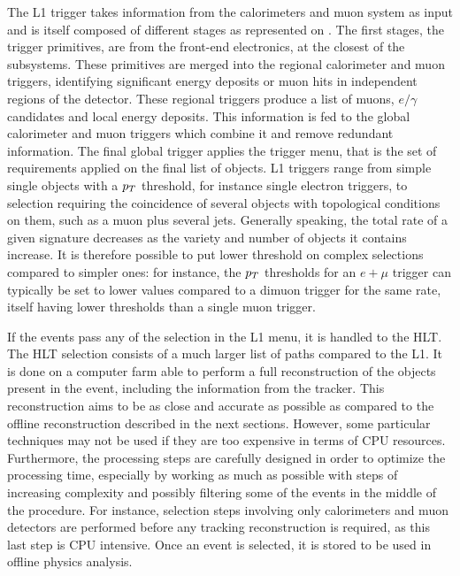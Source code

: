     The L1 trigger takes information from the calorimeters and muon system as input
    and is itself composed of different stages as
    represented on . The first stages, the trigger primitives,
    are from the front-end electronics, at the closest of the subsystems.
    These primitives are merged into the regional calorimeter and muon triggers,
    identifying significant energy deposits or muon hits in independent regions of the
    detector. These regional triggers produce a list of muons, $e/\gamma$ candidates
    and local energy deposits. This information is fed to the global calorimeter and
    muon triggers which combine it and remove redundant information. The final global trigger applies
    the trigger menu, that is the set of requirements applied on the final list of
    objects. L1 triggers range from simple single objects with a $p_T$ threshold,
    for instance single electron triggers, to
    selection requiring the coincidence of several objects with topological conditions
    on them, such as a muon plus several jets. Generally speaking, the total rate of
    a given signature decreases as the variety and number of objects it contains increase.
    It is therefore possible to put lower threshold on complex selections compared to
    simpler ones: for instance, the $p_T$ thresholds for an $e+\mu$ trigger can typically
    be set to lower values compared to a dimuon trigger for the same rate, itself having
    lower thresholds than a single muon trigger.

    If the events pass any of the selection in the L1 menu, it is handled to the HLT.
    The HLT selection consists of a much larger list of paths compared to the L1.
    It is done on a computer farm able to perform a full reconstruction
    of the objects present in the event, including the information from the tracker.
    This reconstruction aims to be as close and accurate as possible as compared to the
    offline reconstruction described in the next sections.
    However, some particular techniques may not be used if they are too expensive in
    terms of CPU resources. Furthermore, the processing steps are carefully designed in order to
    optimize the processing time, especially by working as much as possible with steps
    of increasing complexity and possibly filtering some of the events in the middle
    of the procedure. For instance, selection steps involving only calorimeters and
    muon detectors are performed before any tracking reconstruction is required, as this
    last step is CPU intensive. Once an event is selected, it is stored to be used in
    offline physics analysis.

